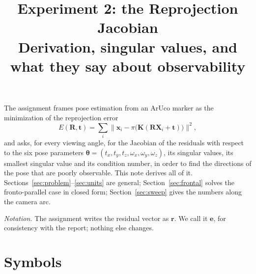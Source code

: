 \documentclass[11pt,a4paper]{article}
\title{Experiment 2: the Reprojection Jacobian\\[0.3em]
       \large Derivation, singular values, and what they say about observability}
\date{}
\theoremstyle{remark}
\newcommand{\Rmat}{\mathbf{R}}
\newcommand{\Kmat}{\mathbf{K}}
\newcommand{\evec}{\mathbf{e}}
\newcommand{\tvec}{\mathbf{t}}
\newcommand{\Xvec}{\mathbf{X}}
\newcommand{\xvec}{\mathbf{x}}
\newcommand{\thetavec}{\boldsymbol{\theta}}
\begin{document}
\maketitle

\noindent
The assignment frames pose estimation from an ArUco marker as the minimization
of the reprojection error
\[
  E(\Rmat,\tvec) = \sum_i \big\| \xvec_i - \pi\big(\Kmat(\Rmat\Xvec_i + \tvec)\big)\big\|^2 ,
\]
and asks, for every viewing angle, for the Jacobian of the residuals with
respect to the six pose parameters $\thetavec = (t_x,t_y,t_z,\omega_x,\omega_y,
\omega_z)$, its singular values, its smallest singular value and its condition
number, in order to find the directions of the pose that are poorly observable.
This note derives all of it. Sections~\ref{sec:problem}--\ref{sec:units} are
general; Section~\ref{sec:frontal} solves the fronto-parallel case in closed
form; Section~\ref{sec:sweep} gives the numbers along the camera arc.

\medskip\noindent
\emph{Notation.} The assignment writes the residual vector as $\mathbf{r}$. We
call it $\evec$, for consistency with the report; nothing else changes.

\tableofcontents

\section{Symbols}
\label{sec:symbols}
\end{document}
